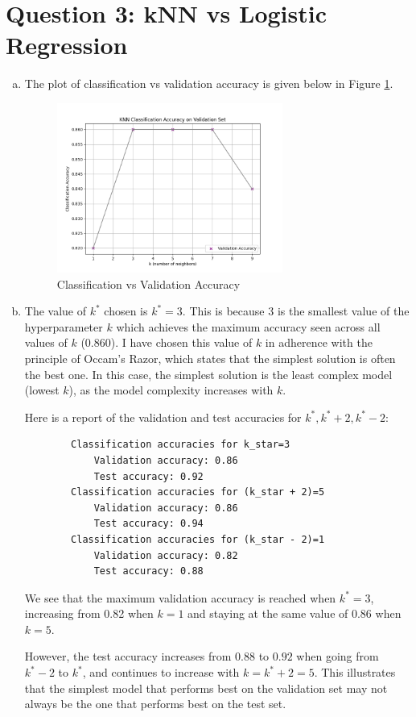 \documentclass{article}
\begin{document}
\newpage
\section*{Question 3: kNN vs Logistic Regression}

\begin{enumerate}[(a)]
    \item The plot of classification vs validation accuracy is given below in Figure \ref{fig:q3a}.
    
    \begin{figure}[H]
        \centering
        \includegraphics[width=0.7\textwidth]{../figures/knn_classification_accuracy.png}
        \caption{Classification vs Validation Accuracy}
        \label{fig:q3a}
    \end{figure}

    \item The value of $k^*$ chosen is $k^* = 3$. This is because $3$ is the smallest value of the hyperparameter $k$ which achieves the maximum accuracy seen across all values of $k$ (0.860). I have chosen this value of $k$ in adherence with the principle of Occam's Razor, which states that the simplest solution is often the best one. In this case, the simplest solution is the least complex model (lowest $k$), as the model complexity increases with $k$. 
    
    Here is a report of the validation and test accuracies for $k^*, k^* + 2, k^* - 2$:

    \begin{verbatim}
        Classification accuracies for k_star=3
            Validation accuracy: 0.86
            Test accuracy: 0.92
        Classification accuracies for (k_star + 2)=5
            Validation accuracy: 0.86
            Test accuracy: 0.94
        Classification accuracies for (k_star - 2)=1
            Validation accuracy: 0.82
            Test accuracy: 0.88
    \end{verbatim}

    We see that the maximum validation accuracy is reached when $k^* = 3$, increasing from 0.82 when $k = 1$ and staying at the same value of 0.86 when $k = 5$.
    
    However, the test accuracy increases from $0.88$ to $0.92$ when going from $k^* - 2$ to $k^*$, and continues to increase with $k = k^* + 2 = 5$. This illustrates that the simplest model that performs best on the validation set may not always be the one that performs best on the test set. 
\end{enumerate}
\end{document}
